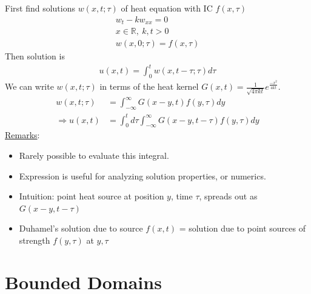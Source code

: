 \documentclass[12pt, letterpaper]{article}
\begin{document}
First find solutions $w(x,t;\tau)$ of heat equation with IC $f(x,\tau)$
\begin{align*}
    w_t - kw_{xx} = 0 \\
    x \in \mathbb{R},\ k, t > 0 \\
    w(x,0; \tau) = f(x,\tau)
\end{align*}
Then solution is 
\begin{align*}
    u(x,t) = \int_{0}^{t} w(x, t-\tau;\tau)d\tau \tag{Duhamel's principle}
\end{align*}
We can write $w(x,t;\tau)$ in terms of the heat kernel $G(x,t) = \displaystyle\frac{1}{\sqrt{4\pi kt}} e^{\frac{-x^2}{4kt}}$.
\begin{align*}
    w(x,t;\tau)&= \int_{-\infty}^{\infty} G(x-y,t) f(y,\tau)dy \\ 
    \Rightarrow u(x,t) &= \int_{0}^{t}d\tau \int_{-\infty}^{\infty} G(x-y,t-\tau)f(y,\tau)dy
\end{align*}
\underline{Remarks}:
\begin{itemize}
    \item Rarely possible to evaluate this integral.
    \item Expression is useful for analyzing solution properties, or numerics.
    \item Intuition: point heat source at position $y$, time $\tau$, spreads out as $G(x-y,t-\tau)$
    \item Duhamel's solution due to source $f(x,t)$ = solution due to point sources of strength 
    $f(y,\tau)$ at $y,\tau$
\end{itemize}
\section{Bounded Domains}
\end{document}
